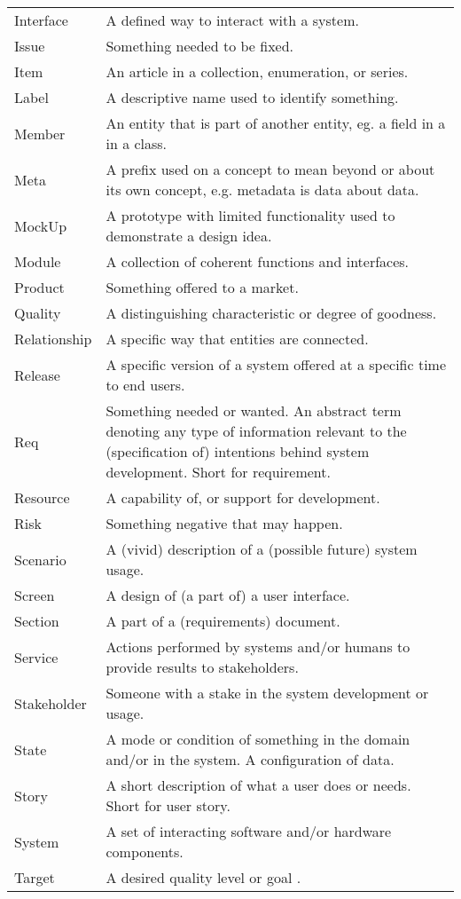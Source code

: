 \documentclass[a4paper]{llncs}
\begin{document}
\begin{minipage}{1\linewidth}
\begin{minipage}{0.36\textwidth}
\begin{table}[H]
\begin{tabular}{|l p{5.0cm}|}
Interface&A defined way to interact with a system.\\
Issue&Something needed to be fixed.\\
Item& An article in a collection, enumeration, or series.\\
Label&A descriptive name used to identify something.\\
Member&An entity that is part of another entity, eg. a field in a in a class.\\
Meta&A prefix used on a concept to mean beyond or about its own concept, e.g. metadata is data about data.\\
MockUp&A prototype with limited functionality used to demonstrate a design idea.\\
Module&A collection of coherent functions and interfaces.\\
Product&Something offered to a market.\\
Quality&A distinguishing characteristic or degree of goodness.\\
Relationship&A specific way that entities are connected.\\
Release&A specific version of a system offered at a specific time to end users.\\
Req&Something needed or wanted. An abstract term denoting any type of information relevant to the (specification of) intentions behind system development. Short for requirement.\\
Resource&A capability of, or support for development.\\
Risk&Something negative that may happen.\\
Scenario&A (vivid) description of a (possible future) system usage.\\
Screen&A design of (a part of) a user interface.\\
Section&A part of a (requirements) document.\\
Service&Actions performed by systems and/or humans to provide results to stakeholders.\\
Stakeholder&Someone with a stake in the system development or usage.\\
State&A mode or condition of something in the domain and/or in the system. A configuration of data.\\
Story&A short description of what a user does or needs. Short for user story.\\
System&A set of interacting software and/or hardware components.\\
Target&A desired quality level or goal .\\

\end{tabular}
\end{table}
\end{minipage}
\end{minipage}
\end{document}
